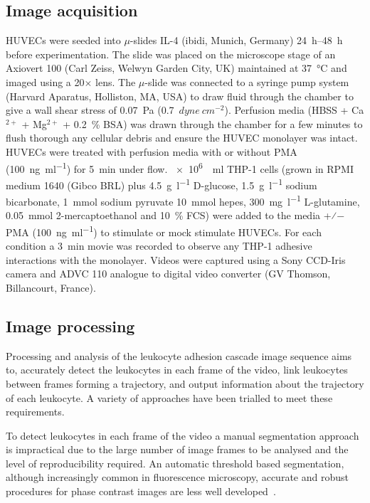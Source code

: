 \subsection{Image acquisition}
HUVECs were seeded into $\mu$-slides IL-4 (ibidi, Munich, Germany) \SIrange{24}{48}{\hour} before experimentation. The slide was placed on the microscope stage of an Axiovert 100 (Carl Zeiss, Welwyn Garden City, UK) maintained at \SI{37}{\celsius} and imaged using a 20$\times$ lens. The $\mu$-slide was connected to a syringe pump system (Harvard Aparatus, Holliston, MA, USA) to draw fluid through the chamber to give a wall shear stress of \SI{0.07}{\pascal} (0.7~$dyne~cm^{-2}$). Perfusion media (HBSS + Ca$^{2+}$ + Mg$^{2+}$ + 0.2~\% BSA) was drawn through the chamber for a few minutes to flush thorough any cellular debris and ensure the HUVEC monolayer was intact. HUVECs were treated with perfusion media with or without PMA (\SI{100}{\nano\gram\per\milli\litre}) for \SI{5}{\minute} under flow. \SI{e6}{\per\milli\litre} THP-1 cells (grown in RPMI medium 1640 (Gibco BRL) plus \SI{4.5}{\gram\per\litre} D-glucose, \SI{1.5}{\gram\per\litre} sodium bicarbonate, \SI{1}{\mmol} sodium pyruvate \SI{10}{\mmol} hepes, \SI{300}{\milli\gram\per\litre} L-glutamine, \SI{0.05}{\mmol} 2-mercaptoethanol and 10~\% FCS) were added to the media +⁄− PMA (\SI{100}{\nano\gram\per\milli\litre}) to stimulate or mock stimulate HUVECs. For each condition a \SI{3}{\minute} movie was recorded to observe any THP-1 adhesive interactions with the monolayer. Videos were captured using a Sony CCD-Iris camera and ADVC 110 analogue to digital video converter (GV Thomson, Billancourt, France). 

\subsection{Image processing}
Processing and analysis of the leukocyte adhesion cascade image sequence aims to, accurately detect the leukocytes in each frame of the video, link leukocytes between frames forming a trajectory, and output information about the trajectory of each leukocyte. A variety of approaches have been trialled to meet these requirements.

To detect leukocytes in each frame of the video a manual segmentation approach is impractical due to the large number of image frames to be analysed and the level of reproducibility required. An automatic threshold based segmentation, although increasingly common in fluorescence microscopy, accurate and robust procedures for phase contrast images are less well developed~\cite{Hand2009}. 

